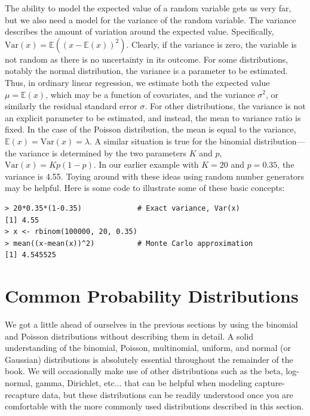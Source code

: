 The ability to model the expected value of a random variable gets us
very far, but we also need a model for the variance of the random
variable. The variance describes the amount of variation around the
expected value. Specifically, $\text{Var}(x) = \mathbb{E}((x -
\mathbb{E}(x))^2)$. Clearly, if the variance is zero, the variable is
not random as there is no uncertainty in its outcome.
For some distributions, notably the normal distribution, the variance
is a parameter to be estimated. Thus, in ordinary linear regression,
we estimate both the expected value $\mu=\mathbb{E}(x)$,
which may be a function of covariates, and the variance
$\sigma^2$, or similarly the residual standard error $\sigma$. For
other distributions, the variance is not an explicit parameter to be
estimated, and instead, the mean to variance ratio is fixed. In the
case of the Poisson distribution, the mean is equal to the
variance, $\mathbb{E}(x) = \text{Var}(x) = \lambda$.
A similar situation is true for the binomial distribution---the variance is
determined by the two parameters $K$ and $p$, $\text{Var}(x) = Kp(1-p)$.
In our earlier example with $K=20$ and $p=0.35$, the variance is
4.55. Toying around with these ideas using random number generators
may be helpful. Here is some code to illustrate some of these basic concepts:
\begin{verbatim}
> 20*0.35*(1-0.35)             # Exact variance, Var(x)
[1] 4.55
> x <- rbinom(100000, 20, 0.35)
> mean((x-mean(x))^2)          # Monte Carlo approximation
[1] 4.545525
\end{verbatim}



\section{Common Probability Distributions}
\label{sec.modeling.distributions}

We got a little ahead of ourselves in the previous sections by using
the binomial and Poisson distributions without describing them in detail.
A solid understanding of the binomial, Poisson, multinomial, uniform,
and normal (or Gaussian)
distributions is absolutely essential throughout the
remainder of the book. We will occasionally make use of other
distributions such as the 
beta, log-normal, 
gamma, Dirichlet, etc$\dots$ that can be helpful when
modeling capture-recapture data, but these distributions can be
readily understood once you are comfortable with the more commonly
used distributions described in this section.

